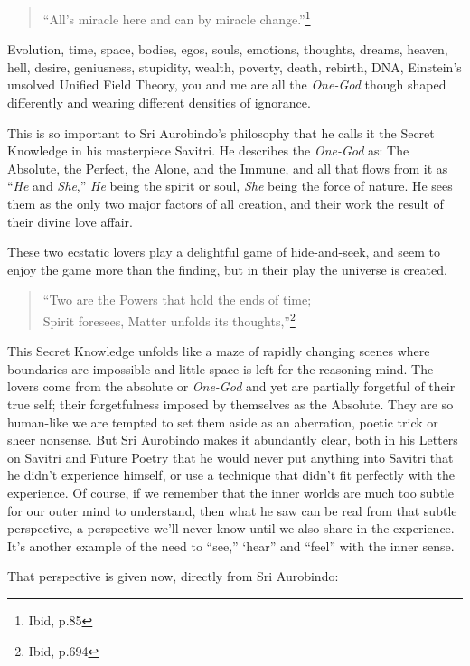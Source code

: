 \documentclass[12pt,a4paper]{book}
\begin{document}
\begin{verse}
``All's miracle here and can by miracle change.''\footnote{Ibid,
  p.85}
\end{verse}

Evolution, time, space, bodies, egos, souls, emotions, thoughts,
dreams, heaven, hell, desire, geniusness, stupidity, wealth, poverty,
death, rebirth, DNA, Einstein's unsolved Unified Field Theory, you and
me are all the \emph{One-God} though shaped differently and wearing
different densities of ignorance.

This is so important to Sri Aurobindo's philosophy that he calls it
the Secret Knowledge in his masterpiece Savitri. He describes the
\emph{One-God} as: The Absolute, the Perfect, the Alone, and the
Immune, and all that flows from it as ``\emph{He} and \emph{She},''
\emph{He} being the spirit or soul, \emph{She} being the force of
nature. He sees them as the only two major factors of all creation,
and their work the result of their divine love affair.

These two ecstatic lovers play a delightful game of hide-and-seek, and
seem to enjoy the game more than the finding, but in their play the
universe is created.

\begin{verse}
``Two are the Powers that hold the ends of time;\\
Spirit foresees, Matter unfolds its thoughts,''\footnote{Ibid, p.694}
\end{verse}

This Secret Knowledge unfolds like a maze of rapidly changing scenes
where boundaries are impossible and little space is left for the
reasoning mind. The lovers come from the absolute or \emph{One-God}
and yet are partially forgetful of their true self; their
forgetfulness imposed by themselves as the Absolute. They are so
human-like we are tempted to set them aside as an aberration, poetic
trick or sheer nonsense. But Sri Aurobindo makes it abundantly clear,
both in his Letters on Savitri and Future Poetry that he would never
put anything into Savitri that he didn't experience himself, or use a
technique that didn't fit perfectly with the experience. Of course, if
we remember that the inner worlds are much too subtle for our outer
mind to understand, then what he saw can be real from that subtle
perspective, a perspective we'll never know until we also share in the
experience. It's another example of the need to ``see,'' ‘hear'' and
``feel'' with the inner sense.

\noindent That perspective is given now, directly from Sri Aurobindo:
\end{document}
